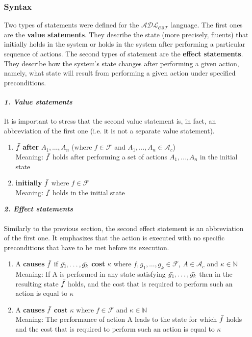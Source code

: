 \documentclass[a4paper]{article}
\begin{document}
\subsubsection{Syntax} \label{statements}
%
Two types of statements were defined for the $\mathcal{ADL_{CST}}$ language. The first ones are the \textbf{value statements}. They describe the state (more precisely, fluents) that initially holds in the system or holds in the system after performing a particular sequence of actions. The second types of statement are the \textbf{effect statements}. They describe how the system's state changes after performing a given action, namely, what state will result from performing a given action under specified preconditions.
\\ \\
\textbf{\textit{1. Value statements}}
\\ \\
It is important to stress that the second value statement is, in fact, an abbreviation of the first one (i.e. it is not a separate value statement).
\begin{enumerate}
    \item $\Bar{f}$ \textbf{after} $A_1,\dotsc,A_n$ (where $f \in \mathcal{F}$ and $A_1,\dotsc,A_n \in \mathcal{A}_c$) \\[0.5\baselineskip]
    Meaning: $\Bar{f}$ holds after performing a set of actions $A_1,\dotsc,A_n$ in the initial state
    \item \textbf{initially} $\Bar{f}$ where $f \in \mathcal{F}$ \\[0.5\baselineskip]
    Meaning: $\Bar{f}$ holds in the initial state
\end{enumerate}
\textbf{\textit{2. Effect statements}}
\\ \\
Similarly to the previous section, the second effect statement is an abbreviation of the first one. It emphasizes that the action is executed with no specific preconditions that have to be met before its execution.
\begin{enumerate}
    \item A \textbf{causes} $\Bar{f}$ if $\Bar{g_1},\dotsc,\Bar{g_k}$ \textbf{cost} $\kappa$ where $f,g_1,\dotsc,g_k\in\mathcal{F}$, $A\in\mathcal{A}_c$ and $\kappa\in\mathbb{N}$ \\[0.5\baselineskip]
    Meaning: If A is performed in any state satisfying $\Bar{g_1},\dotsc,\Bar{g_k}$ then in the resulting state $\Bar{f}$ holds, and the cost that is required to perform such an action is equal to $\kappa$
    \item A \textbf{causes} $\Bar{f}$ \textbf{cost} $\kappa$ where $f\in\mathcal{F}$ and $\kappa\in\mathbb{N}$ \\[0.5\baselineskip]
    Meaning: The performance of action A leads to the state for which $\Bar{f}$ holds and the cost that is required to perform such an action is equal to $\kappa$ 
\end{enumerate}
%
\end{document}

